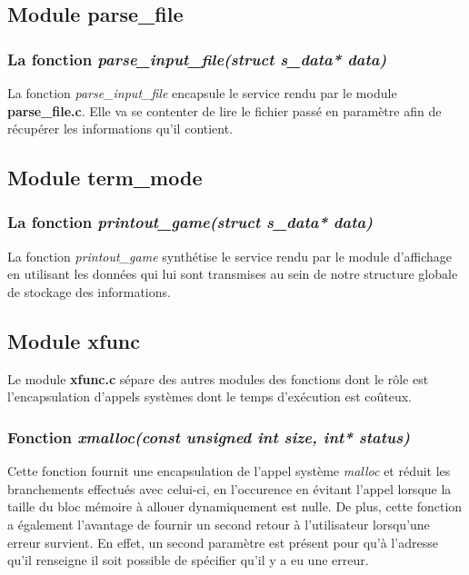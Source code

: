 \documentclass{report}
\begin{document}
\subsection{Module parse\_file}
\subsubsection*{La fonction \textit{parse\_input\_file(struct s\_data* data)}}
La fonction \textit{parse\_input\_file} encapsule le service rendu par le module \textbf{parse\_file.c}.
Elle va se contenter de lire le fichier passé en paramètre afin de récupérer les informations qu'il contient.

\subsection{Module term\_mode}
\subsubsection*{La fonction \textit{printout\_game(struct s\_data* data)}}
La fonction \textit{printout\_game} synthétise le service rendu par le module d'affichage en utilisant les données qui lui sont transmises au sein de notre structure globale de stockage des informations.

\subsection{Module xfunc}
Le module \textbf{xfunc.c} sépare des autres modules des fonctions dont le rôle est l'encapsulation d'appels systèmes dont le temps d'exécution est coûteux.
\subsubsection*{Fonction \textit{xmalloc(const unsigned int size, int* status)}}
Cette fonction fournit une encapsulation de l'appel système \textit{malloc} et réduit les branchements effectués avec celui-ci, en l'occurence en évitant l'appel lorsque la taille du bloc mémoire à allouer dynamiquement est nulle.
De plus, cette fonction a également l'avantage de fournir un second retour à l'utilisateur lorsqu'une erreur survient. En effet, un second paramètre est présent pour qu'à l'adresse qu'il renseigne il soit possible de spécifier qu'il y a eu une erreur.
\end{document}

